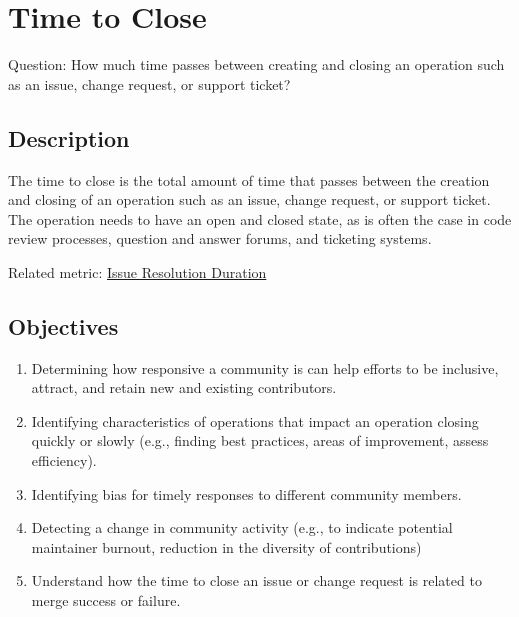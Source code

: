 \hypertarget{time-to-close}{%
\section{Time to Close}\label{time-to-close}}

Question: How much time passes between creating and closing an operation
such as an issue, change request, or support ticket?

\hypertarget{description}{%
\subsection{Description}\label{description}}

The time to close is the total amount of time that passes between the
creation and closing of an operation such as an issue, change request,
or support ticket. The operation needs to have an open and closed state,
as is often the case in code review processes, question and answer
forums, and ticketing systems.

Related metric:
\href{https://chaoss.community/metric-issue-resolution-duration/}{Issue
Resolution Duration}

\hypertarget{objectives}{%
\subsection{Objectives}\label{objectives}}

\begin{enumerate}
\tightlist
\item
  Determining how responsive a community is can help efforts to be
  inclusive, attract, and retain new and existing contributors.\\
\item
  Identifying characteristics of operations that impact an operation
  closing quickly or slowly (e.g., finding best practices, areas of
  improvement, assess efficiency).\\
\item
  Identifying bias for timely responses to different community
  members.\\
\item
  Detecting a change in community activity (e.g., to indicate potential
  maintainer burnout, reduction in the diversity of contributions)\\
\item
  Understand how the time to close an issue or change request is related
  to merge success or failure.
\end{enumerate}

